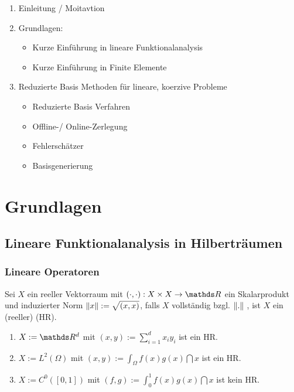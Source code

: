 \begin{enumerate}[1)]
	\item Einleitung / Moitavtion
	\item Grundlagen:
	\begin{itemize}
		\item Kurze Einführung in lineare Funktionalanalysis
		\item Kurze Einführung in Finite Elemente
	\end{itemize}
	\item Reduzierte Basis Methoden für lineare, koerzive Probleme
	\begin{itemize}
		\item Reduzierte Basis Verfahren
		\item Offline-/ Online-Zerlegung
		\item Fehlerschätzer
		\item Basisgenerierung
	\end{itemize}
\end{enumerate}


\section{Grundlagen}

\subsection{Lineare Funktionalanalysis in Hilberträumen}

\subsubsection{Lineare Operatoren}

Sei $X$ ein reeller Vektorraum mit $(\cdot,\cdot):X\times X\to \R$ ein Skalarprodukt und induzierter Norm $\left\Vert x\right\Vert:= \sqrt{(x,x)}$, falls $X$ vollständig bzgl. $\left\Vert.\right\Vert$ , ist $X$ ein (reeller)  (HR).

\begin{enumerate}[(1)]
	\item $X:= \R^d$ mit $(x,y) := \sum_{i=1}^{d} x_i y_i$ ist ein HR.
	\item $X:= L^2(\Omega)$ mit $(x,y) := \int_{\Omega} f(x)g(x)\dint x $ ist ein HR.
	\item $X:=C^0([0,1])$ mit $(f,g) := \int_{0}^{1} f(x) g(x) \dint x$ ist kein HR.
\end{enumerate}


